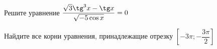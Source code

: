 \begin{ex}
	\begin{condition}
		\begin{enumcols}[label=\asbuk*)]
			\item Решите уравнение \( \dfrac{\sqrt{3}\tg^3 x -\tg x}{\sqrt{-5\cos x}} = 0 \)
			\item Найдите все корни уравнения, принадлежащие отрезку \( \left[-3\pi;-\dfrac{3\pi}{2}\right] \)
		\end{enumcols}
	\end{condition}
\end{ex}